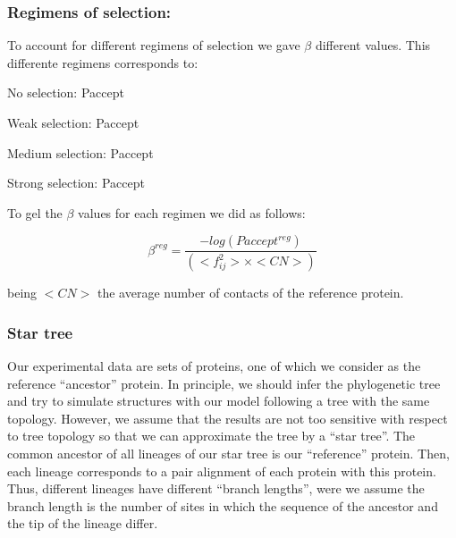 \documentclass{article}
\begin{document}
\begin{multicols}{2}
{{\subsubsection*{Regimens of selection:}
To account for different regimens of selection we gave $\beta$ different values. This differente regimens corresponds to:

\item No selection: Paccept 

\item Weak selection: Paccept 

\item Medium selection: Paccept 

\item Strong selection: Paccept 

To gel the $\beta$ values for each regimen we did as follows:

\begin{equation} \label{eq:PacceptFij}
\beta^{reg} = \frac{- log(Paccept^{reg})}{(<f_{ij}^2> \times <CN>)} 
\end{equation}

being $<CN>$ the average number of contacts of the reference protein.

\subsubsection*{Star tree}
Our experimental data are sets of proteins, one of which we consider as the reference ``ancestor'' protein. In principle, we should infer the phylogenetic tree and try to simulate structures with our model following a tree with the same topology. However, we assume that the results are not too sensitive with respect to tree topology so that we can approximate the tree by a ``star tree''. The common ancestor of all lineages of our star tree is our ``reference'' protein. Then, each lineage corresponds to a pair alignment of each protein with this protein. Thus, different lineages have different ``branch lengths'', were we assume the branch length is the number of sites in which the sequence of the ancestor and the tip of the lineage differ. 

}}
\end{multicols}
\end{document}
